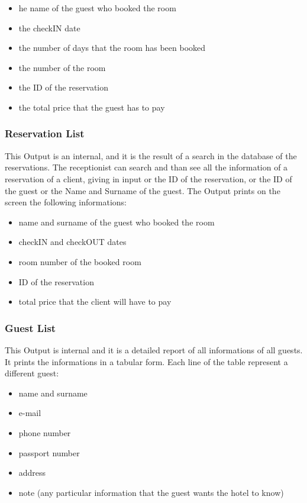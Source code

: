 \begin{itemize}
  \item he name of the guest who booked the room
  \item the checkIN date
  \item the number of days that the room has been booked
  \item the number of the room
  \item the ID of the reservation
  \item the total price that the guest has to pay
\end{itemize}


\subsubsection{Reservation List}
This Output is an internal, and it is the result of a search in the database of the reservations. The receptionist can search and than see all the information of a reservation of a client, giving in input or the ID of the reservation, or the ID of the guest or the Name and Surname of the guest. The Output prints on the screen the following informations:

\begin{itemize}
  \item name and surname of the guest who booked the room
  \item checkIN and checkOUT dates
  \item room number of the booked room
  \item ID of the reservation
  \item total price that the client will have to pay
\end{itemize}

\subsubsection{Guest List}
This Output is internal and it is a detailed report of all informations of all guests. It prints the informations in a tabular form. Each line of the table represent a different guest:

\begin{itemize}
  \item name and surname
  \item e-mail
  \item phone number
  \item passport number
  \item address
  \item note (any particular information that the guest wants the hotel to know)
\end{itemize}

